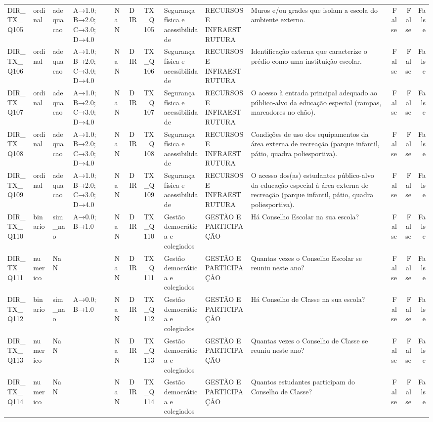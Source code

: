 \begin{tabular}{llllllllllrrr}
DIR\_TX\_Q105 & ordinal & adequacao & A→1.0; B→2.0; C→3.0; D→4.0 & NaN & DIR & TX\_Q105 & Segurança física e acessibilidade & RECURSOS E INFRAESTRUTURA & Muros e/ou grades que isolam a escola do ambiente externo. & False & False & False \\
DIR\_TX\_Q106 & ordinal & adequacao & A→1.0; B→2.0; C→3.0; D→4.0 & NaN & DIR & TX\_Q106 & Segurança física e acessibilidade & RECURSOS E INFRAESTRUTURA & Identificação externa que caracterize o prédio como uma instituição escolar. & False & False & False \\
DIR\_TX\_Q107 & ordinal & adequacao & A→1.0; B→2.0; C→3.0; D→4.0 & NaN & DIR & TX\_Q107 & Segurança física e acessibilidade & RECURSOS E INFRAESTRUTURA & O acesso à entrada principal adequado ao público-alvo da educação especial (rampas, marcadores no chão). & False & False & False \\
DIR\_TX\_Q108 & ordinal & adequacao & A→1.0; B→2.0; C→3.0; D→4.0 & NaN & DIR & TX\_Q108 & Segurança física e acessibilidade & RECURSOS E INFRAESTRUTURA & Condições de uso dos equipamentos da área externa de recreação (parque infantil, pátio, quadra poliesportiva). & False & False & False \\
DIR\_TX\_Q109 & ordinal & adequacao & A→1.0; B→2.0; C→3.0; D→4.0 & NaN & DIR & TX\_Q109 & Segurança física e acessibilidade & RECURSOS E INFRAESTRUTURA & O acesso dos(as) estudantes público-alvo da educação especial à área externa de recreação (parque infantil, pátio, quadra poliesportiva). & False & False & False \\
DIR\_TX\_Q110 & binario & sim\_nao & A→0.0; B→1.0 & NaN & DIR & TX\_Q110 & Gestão democrática e colegiados & GESTÃO E PARTICIPAÇÃO & Há Conselho Escolar na sua escola? & False & False & False \\
DIR\_TX\_Q111 & numerico & NaN &  & NaN & DIR & TX\_Q111 & Gestão democrática e colegiados & GESTÃO E PARTICIPAÇÃO & Quantas vezes o Conselho Escolar se reuniu neste ano? & False & False & False \\
DIR\_TX\_Q112 & binario & sim\_nao & A→0.0; B→1.0 & NaN & DIR & TX\_Q112 & Gestão democrática e colegiados & GESTÃO E PARTICIPAÇÃO & Há Conselho de Classe na sua escola? & False & False & False \\
DIR\_TX\_Q113 & numerico & NaN &  & NaN & DIR & TX\_Q113 & Gestão democrática e colegiados & GESTÃO E PARTICIPAÇÃO & Quantas vezes o Conselho de Classe se reuniu neste ano? & False & False & False \\
DIR\_TX\_Q114 & numerico & NaN &  & NaN & DIR & TX\_Q114 & Gestão democrática e colegiados & GESTÃO E PARTICIPAÇÃO & Quantos estudantes participam do Conselho de Classe? & False & False & False \\

\end{tabular}
